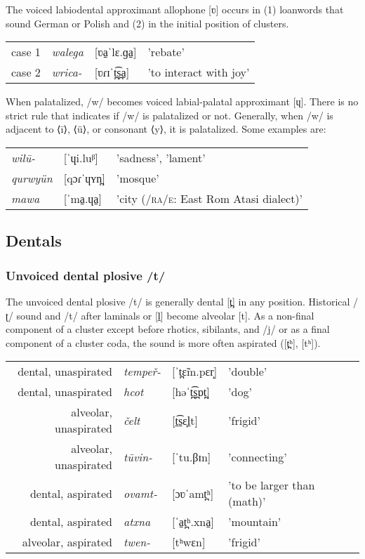 The voiced labiodental approximant allophone [ʋ] occurs in (1) loanwords that sound German or Polish and (2) in the initial position of clusters.

\begin{tabular}{rlll}
case 1     & \textit{walega}    & {[}ʋa̠ˈlɛ.ɡa̠{]}    & 'rebate'                 \\
case 2     & \textit{wrica-}   & {[}ʋɾɪˈt̪͡s̪a̠{]}     & 'to interact with joy'                 \\
\end{tabular}

When palatalized, /w/ becomes voiced labial-palatal approximant [ɥ]. There is no strict rule that indicates if /w/ is palatalized or not. Generally, when /w/ is adjacent to ⟨ī⟩, ⟨ü⟩, or consonant ⟨y⟩, it is palatalized. Some examples are:

\begin{tabular}{lll}
\textit{wilū-}   & {[}ˈɥi.luᵝ{]}     & 'sadness', 'lament'                 \\
\textit{qurwyün}     & {[}qɔɾˈɥʏn̪{]}     & 'mosque'      \\
\textit{mawa}  & {[}ˈma̠.ɥa̠{]}      & 'city (\textsc{/ra/e}: East Rom Atasi dialect)' \\
\end{tabular}

\subsection{Dentals}
\subsubsection{Unvoiced dental plosive /t/}
The unvoiced dental plosive /t/ is generally dental [t̪] in any position. Historical /ʈ/ sound and /t/ after laminals or [l̠] become alveolar [t].
As a non-final component of a cluster except before rhotics, sibilants, and /j/ 
or as a final component of a cluster coda, the sound is more often aspirated ([t̪ʰ], [tʰ]).

\begin{tabular}{rlll}
dental, unaspirated & \textit{tempeř-}   & {[}ˈt̪ɛ̃m.pɛr̝{]}     & 'double'                 \\
dental, unaspirated & \textit{hcot}     & {[}həˈt̪͡s̪ɒt̪{]}     & 'dog'      \\
alveolar, unaspirated & \textit{čelt}  & {[}t̠͡s̠ɛ̞l̠t{]}      & 'frigid' \\
alveolar, unaspirated & \textit{tūvin-}  & {[}ˈtu.βɪn{]}      & 'connecting' \\
dental, aspirated & \textit{ovamt-}   & {[}ɔʋˈamt̪ʰ{]}     & 'to be larger than (math)'                 \\
dental, aspirated & \textit{atxna}     & {[}ˈa̠t̪ʰ.xna̠{]}     & 'mountain'      \\
alveolar, aspirated & \textit{twen-}  & {[}tʰwɛn{]}      & 'frigid' \\
\end{tabular}

